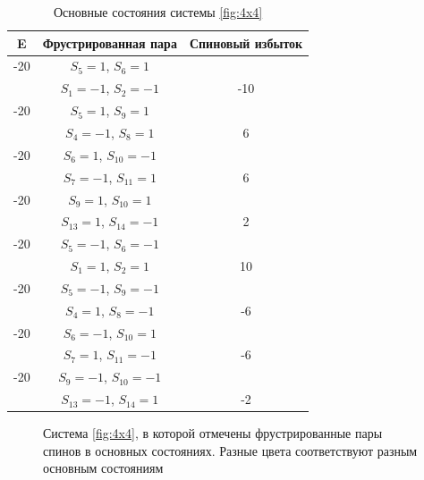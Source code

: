 \documentclass[utf8, babel, sor, jor, amsmath, amssymb, reprint]{elsarticle} %
\begin{document}
\begin{table}[h]
	\centering
	\begin{tabular}{|c|c|c|}
		\hline
		E   &   Фрустрированная пара & Спиновый избыток \\
		\hline
		-20   &  $S_5=1$, $S_6=1$& \\
		&    $S_1=-1$, $S_2=-1$ & -10\\
		\hline
		-20   &  $S_5=1$, $S_9=1$& \\
		&    $S_4=-1$, $S_8=1$& 6\\
		\hline
		-20   &  $S_6=1$, $S_{10}=-1$&\\
		&    $S_7=-1$, $S_{11}=1$& 6\\
		\hline
		-20   &  $S_9=1$, $S_{10}=1$&\\
		&    $S_{13}=1$, $S_{14}=-1$& 2\\
		\hline
		-20   &  $S_5=-1$, $S_6=-1$&\\
		&    $S_1=1$, $S_2=1$& 10\\
		\hline
		-20   &  $S_5=-1$, $S_9=-1$&\\
		&    $S_4=1$, $S_8=-1$& -6\\
		\hline
		-20   &  $S_6=-1$, $S_{10}=1$&\\
		&    $S_7=1$, $S_{11}=-1$& -6\\
		\hline
		-20   &  $S_9=-1$, $S_{10}=-1$&\\
		&    $S_{13}=-1$, $S_{14}=1$& -2\\
		\hline
	\end{tabular}
	\caption{Основные состояния системы \ref{fig:4x4}}
	\label{tab:gs_4x4}
\end{table}

\begin{figure}[h]
	\centering
	\caption{Система \ref{fig:4x4}, в которой отмечены фрустрированные пары спинов в основных состояниях. Разные цвета соответствуют разным основным состояниям}
	\label{fig:4x4.1}
\end{figure}
\end{document}
